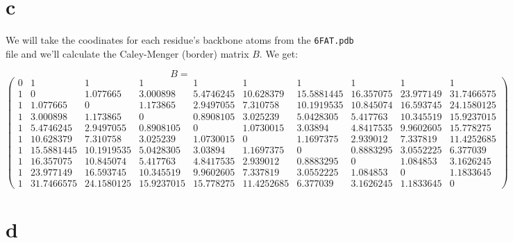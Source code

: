 \documentclass[a4paper,11pt]{article}
\begin{document}
\section*{c}

We will take the coodinates for each residue's backbone atoms from the \verb|6FAT.pdb| file and we'll calculate the Caley-Menger (border) matrix $B$. We get:

\begin{small}
  \[B =\]
  \[\begin{pmatrix}
    0 & 1 & 1 & 1 & 1 & 1 & 1 & 1 & 1 & 1\\
    1 & 0 & 1.077665 & 3.000898 & 5.4746245 & 10.628379 & 15.5881445 & 16.357075 & 23.977149 & 31.7466575\\
    1 & 1.077665 & 0 & 1.173865 & 2.9497055 & 7.310758 & 10.1919535 & 10.845074 & 16.593745  & 24.1580125\\
    1 & 3.000898 & 1.173865 & 0 & 0.8908105 & 3.025239 & 5.0428305 & 5.417763 & 10.345519  & 15.9237015\\
    1 & 5.4746245 & 2.9497055 & 0.8908105 & 0 & 1.0730015 & 3.03894 & 4.8417535 & 9.9602605 & 15.778275\\
    1 & 10.628379 & 7.310758 & 3.025239 & 1.0730015 & 0 & 1.1697375 & 2.939012 & 7.337819 & 11.4252685\\
    1 & 15.5881445 & 10.1919535 & 5.0428305 & 3.03894 & 1.1697375 & 0 & 0.8883295 & 3.0552225 & 6.377039\\
    1 & 16.357075 & 10.845074 & 5.417763 & 4.8417535 & 2.939012 & 0.8883295 & 0 & 1.084853 & 3.1626245\\
    1 & 23.977149 & 16.593745 & 10.345519 & 9.9602605 & 7.337819 & 3.0552225 & 1.084853 & 0 & 1.1833645\\
    1 & 31.7466575 & 24.1580125 & 15.9237015 & 15.778275 & 11.4252685 & 6.377039 & 3.1626245 & 1.1833645 & 0
  \end{pmatrix}\]
\end{small}

\section*{d}
\end{document}
